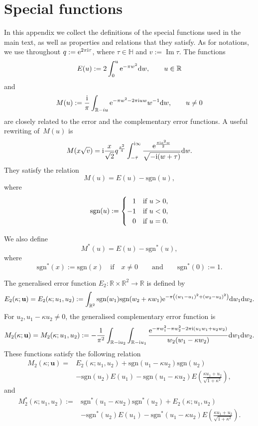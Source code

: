 \documentclass[pdftex]{sigma}
\def\be{\begin{equation}} \def\ee{\end{equation}}
\def\BR{\mathbb{R}}
\def\BH{\mathbb{H}}
\def\sgn{\mathrm{sgn}}
\theoremstyle{definition}
\numberwithin{equation}{section}
\begin{document}
\appendix

\section{Special functions}\label{app:specialFn}

In this appendix we collect the definitions of the special functions used in the main text, as well as properties and relations that they satisfy. As for notations, we use throughout $q:={\rm e}^{2\pi {\rm i}\tau}$, where $\tau \in \BH$ and $v:=\operatorname{Im} \tau$. The functions
\[ %
E(u) := 2\int_0^u {\rm e}^{-\pi w^2} {\rm d}w, \qquad u\in \mathbb{R}
\]
and	
\be \label{def:M}
M(u):=\frac{{\rm i}}{\pi} \int_{\mathbb{R} - i u}
{\rm e}^{-\pi w^2 -2\pi {\rm i} u w} w^{-1} {\rm d}w, \qquad u\neq 0
\ee
are closely related to the error and the complementary error functions. A useful rewriting of~$M(u)$ is \cite{zwegers2008mock}
\begin{equation}
\label{eq:error_rewriting}
M(x\sqrt{v})={\rm i}\frac{x}{\sqrt{2}} q^{\frac{x^2}{4}} \int_{-\bar{\tau}}^{{\rm i}\infty} \frac{{\rm e}^{\frac{\pi {\rm i} x^2 w}{2}}}{\sqrt{-{\rm i}(w+\tau)}}{\rm d}w .
\end{equation}
They satisfy the relation
\[
M(u)=E(u)-\sgn(u),
\]
where
\[
\sgn(u):=\begin{cases}
	\hphantom{-}1 & \text{if}\ u>0, \\
	-1 & \text{if}\ u<0, \\
	\hphantom{-}0 &\text{if}\ u=0.
\end{cases}
\]

We also define
\[
M^\ast(u)=E(u)-\sgn^\ast(u),
\]
where
\[
\sgn^*(x) := \sgn (x) \quad \text{if}\quad x\neq 0\qquad\text{and} \qquad \sgn^*(0) :=1 .
\]

The generalised error function $E_2\colon\BR\times \BR^2 \to \BR$ is defined by
\[
E_2(\kappa ; \mathbf{u}) = E_2(\kappa ; u_1,u_2) := \int_{\BR^2} \sgn(w_1) \sgn(w_2+\kappa w_1)
{\rm e}^{-\pi\left( (w_1-u_1)^2 + (w_2-u_2)^2 \right)} {\rm d}w_1 {\rm d}w_2 .
\]
For $u_2,u_1-\kappa u_2 \neq 0$, the generalised complementary error function is
\be \label{def:M2}
M_2(\kappa ; \mathbf{u}) = M_2(\kappa ; u_1,u_2) := - \frac{1}{\pi^2} \int_{\mathbb{R} - {\rm i} u_2} \int_{\mathbb{R} - {\rm i} u_1}
\frac{{\rm e}^{ -\pi w_1^2 -\pi w_2^2 - 2\pi {\rm i}
		(u_1 w_1 + u_2 w_2) }}{w_2(w_1-\kappa w_2)} {\rm d}w_1{\rm d}w_2 .
\ee
These functions satisfy the following relation
\begin{align*} %
	M_2 (\kappa ; \mathbf{u})
	={}& E_2(\kappa ; u_1, u_2) + \sgn(u_1-\kappa u_2) \sgn(u_2) \\
	& -\sgn(u_2) E(u_1) - \sgn(u_1-\kappa u_2) E \left( \frac{\kappa u_1 + u_2 }{\sqrt{1+\kappa^2}} \right),
\end{align*}
 and
\begin{align}
	M_2^*(\kappa ; u_1, u_2) :={}& \sgn^*(u_1-\kappa u_2) \sgn^*(u_2)
	+ E_2(\kappa; u_1,u_2) \nonumber \\
	& - \sgn^*(u_2) E(u_1) - \sgn^*(u_1-\kappa u_2)
	E\left( \frac{\kappa u_1 + u_2}{\sqrt{1+\kappa^2}} \right) . \label{def:M2star}
\end{align}
\end{document}
